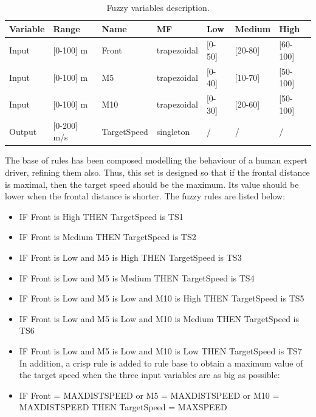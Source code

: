 \documentclass[runningheads,a4paper]{llncs}
\begin{document}
	\begin{table}
		\caption{Fuzzy variables description.}
		\label{tab:flouevar}
		\begin{tabular}{ |p{1.5cm}|p{2cm}|p{2cm}|p{2 cm}|p{1 cm}|p{1.5 cm}|p{1.5 cm}|}
			\hline
			{ \color{red} Variable }&
			{ \color{red} Range }&
			{ \color{red} Name}&  
			{ \color{red} MF } &
			{ \color{red} Low } &
			{ \color{red} Medium }&
			{ \color{red} High } 
			
			\\
			\hline
			\hline
			Input & [0-100] m & Front & trapezoidal & [0-50] & [20-80] & [60-100]
			\\
			\hline
			Input & [0-100] m & M5 & trapezoidal &[0-40] & [10-70] & [50-100] 
			\\
			\hline
			Input & [0-100] m  & M10 & trapezoidal & [0-30] & [20-60] & [50-100]
			\\
			\hline 
			Output & [0-200] m/s & TargetSpeed & singleton & / & / & /
			\\
			\hline 
		\end{tabular} 
	\end{table}
	
	The base of rules has been composed modelling the behaviour of a human expert driver, refining them also. Thus, this set is designed so that if the frontal distance is maximal, then the target speed should be the maximum. Its value should be lower when the frontal distance is shorter. 
	The fuzzy rules are listed below:
	
	\begin{itemize}
		\item IF Front is High THEN TargetSpeed is TS1
		\item IF Front is Medium THEN TargetSpeed is TS2
		\item IF Front is Low and M5 is High THEN TargetSpeed is TS3
		\item IF Front is Low and M5 is Medium THEN TargetSpeed is TS4
		\item IF Front is Low and M5 is Low and M10 is High THEN TargetSpeed is TS5
		\item IF Front is Low and M5 is Low and M10 is Medium THEN TargetSpeed is TS6
		\item IF Front is Low and M5 is Low and M10 is Low THEN TargetSpeed is TS7\\
		
		In addition, a crisp rule is added to rule base to obtain a maximum value of the target speed when the three input variables are as big as possible: 
		\item IF Front = MAXDISTSPEED or M5 = MAXDISTSPEED or M10 = MAXDISTSPEED THEN TargetSpeed = MAXSPEED		
	\end{itemize}
	
\end{document}
